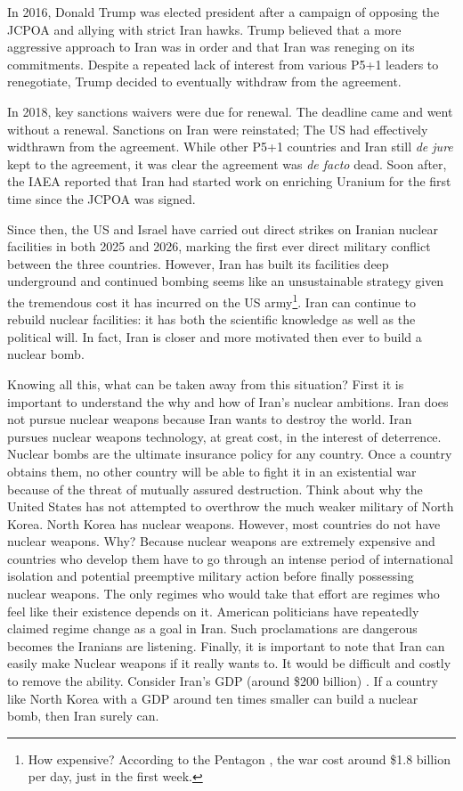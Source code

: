 In 2016, Donald Trump was elected president after a campaign of opposing the
JCPOA and allying with strict Iran hawks. Trump believed that a more aggressive
approach to Iran was in order and that Iran was reneging on its commitments.
Despite a repeated lack of interest from various P5+1 leaders to renegotiate,
Trump decided to eventually withdraw from the agreement.

In 2018, key sanctions waivers were due for renewal. The deadline came and went
without a renewal. Sanctions on Iran were reinstated; The US had effectively
widthrawn from the agreement. While other P5+1 countries and Iran still {\em de
jure} kept to the agreement, it was clear the agreement was {\em de facto} dead.
Soon after, the IAEA reported that Iran had started work on enriching Uranium
for the first time since the JCPOA was signed.

Since then, the US and Israel have carried out direct strikes on Iranian nuclear
facilities in both 2025 and 2026, marking the first ever direct military
conflict between the three countries. However, Iran has built its facilities
deep underground and continued bombing seems like an unsustainable strategy
given the tremendous cost it has incurred on the US army\footnote{How expensive?
According to the Pentagon \parencite{nyt}, the war cost around \$1.8 billion per
day, just in the first week.}. Iran can continue to rebuild nuclear facilities:
it has both the scientific knowledge as well as the political will. In fact,
Iran is closer and more motivated then ever to build a nuclear bomb. 

Knowing all this, what can be taken away from this situation? First it is important
to understand the why and how of Iran's nuclear ambitions. Iran does not pursue
nuclear weapons because Iran wants to destroy the world. Iran pursues nuclear
weapons technology, at great cost, in the interest of deterrence. Nuclear bombs are the
ultimate insurance policy for any country. Once a country obtains them, no other
country will be able to fight it in an existential war because of the threat of
mutually assured destruction. Think about why the United States has not
attempted to overthrow the much weaker military of North Korea. North Korea has
nuclear weapons. However, most countries do not have nuclear weapons. Why?
Because nuclear weapons are extremely expensive and countries who develop them
have to go through an intense period of international isolation and potential
preemptive military action before finally possessing nuclear weapons. The only
regimes who would take that effort are regimes who feel like their existence
depends on it. American politicians have repeatedly claimed regime change as a
goal in Iran. Such proclamations are dangerous becomes the Iranians are
listening. Finally, it is important to note that Iran can easily make Nuclear
weapons if it really wants to. It would be difficult and costly to remove the
ability. Consider Iran's GDP (around \$200 billion) \parencite{gdp:ir}. If a
country like North Korea with a GDP around ten times smaller \parencite{gdp:ko}
can build a nuclear bomb, then Iran surely can.

